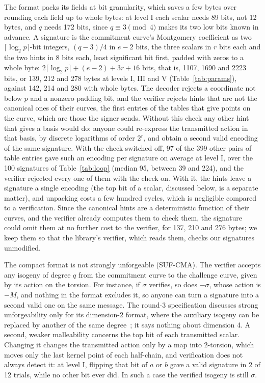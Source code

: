 \documentclass[version=preprint]{iacrcc}
\begin{document}
    The format packs its fields at bit granularity, which saves a few bytes
    over rounding each field up to whole bytes: at level I each scalar needs
    89 bits, not 12 bytes, and $q$ needs 172 bits, since $q \equiv 3 \pmod 4$
    makes its two low bits known in advance. A signature is the commitment
    curve's Montgomery coefficient as two $\lceil \log_2 p \rceil$-bit integers,
    $(q - 3)/4$ in $e - 2$ bits, the three scalars in $r$ bits each and the two
    hints in 8 bits each, least significant bit first, padded with zeros to a
    whole byte: $2 \lceil \log_2 p \rceil + (e - 2) + 3r + 16$ bits, that is,
    1107, 1690 and 2223 bits, or 139, 212 and 278 bytes at levels I, III and V
    (Table~\ref{tab:params}), against 142, 214 and 280 with whole bytes. The
    decoder rejects a coordinate not below $p$ and a nonzero padding bit, and
    the verifier rejects hints that are not the canonical ones of their
    curves, the first entries of the tables that give points on the curve,
    which are those the signer sends. Without this check any other hint that
    gives a basis would do: anyone could re-express the transmitted action in
    that basis, by discrete logarithms of order $2^r$, and obtain a second
    valid encoding of the same signature. With the check switched off, 97 of
    the 399 other pairs of table entries gave such an encoding per signature
    on average at level I, over the 100 signatures of
    Table~\ref{tab:loop} (median 95, between 39 and 224), and the verifier
    rejected every one of them with the check on. With it, the hints
    leave a signature a single encoding (the top bit of a scalar, discussed
    below, is a separate matter), and unpacking costs a few hundred
    cycles, which is negligible compared to a verification. Since the canonical hints are a deterministic function of their curves, and
    the verifier already computes them to check them, the signature could omit
    them at no further cost to the verifier, for 137, 210 and 276 bytes; we
    keep them so that the library's verifier, which reads them, checks our
    signatures unmodified.

    The compact format is not strongly unforgeable (SUF-CMA). The verifier accepts any isogeny of degree $q$ from
    the commitment curve to the challenge curve, given by its action on the
    torsion. For instance, if $\sigma$ verifies, so does $-\sigma$, whose
    action is $-M$, and nothing in the format excludes it, so anyone can turn a
    signature into a second valid one on the same message. The round-3
    specification discusses strong unforgeability only for its dimension-2
    format, where the auxiliary isogeny can be replaced by another of the same
    degree~\cite[Section 8.4.2]{AAA+26}; it says nothing about dimension 4.
    A second, weaker malleability concerns the top bit of each transmitted
    scalar. Changing it changes the transmitted action only by a map into
    2-torsion, which moves only the last kernel point of each half-chain, and
    verification does not always detect it: at level I, flipping that bit of
    $a$ or $b$ gave a valid signature in 2 of 12 trials, while no other bit ever
    did. In such a case the verified isogeny is still $\sigma$.
\end{document}
